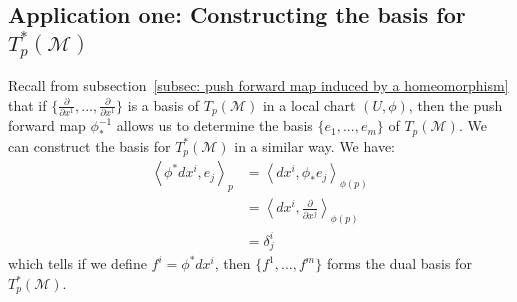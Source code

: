     \subsection{Application one: Constructing the basis for
    $T^*_p(\mathcal{M})$}
      Recall from subsection~\ref{subsec: push forward map induced by a homeomorphism} that if $\{\frac{\partial}{\partial
      x^1},...,\frac{\partial}{\partial x^1}\}$ is a basis of
      $T_p(\mathcal{M})$ in a local chart $(U, \phi)$, then the push forward
      map $\phi^{-1}_*$ allows us to determine the basis $\{e_1,...,e_m\}$ of
      $T_p(\mathcal{M})$.
      We can construct the basis for $T^*_p(\mathcal{M})$ in a similar way. We have: 
      \begin{align*}
        \left\langle \phi^* dx^i, e_j \right\rangle_p 
        &= \left\langle dx^i, \phi_*e_j \right\rangle_{\phi(p)} \\
        &= \left\langle dx^i, \frac{\partial}{\partial x^j} \right\rangle_{\phi(p)} \\
        &= \delta^i_j
      \end{align*}
      which tells if we define $f^i = \phi^* dx^i$, then $\{f^1,...,f^m\}$
      forms the dual basis for $T^{*}_p(\mathcal{M})$.
